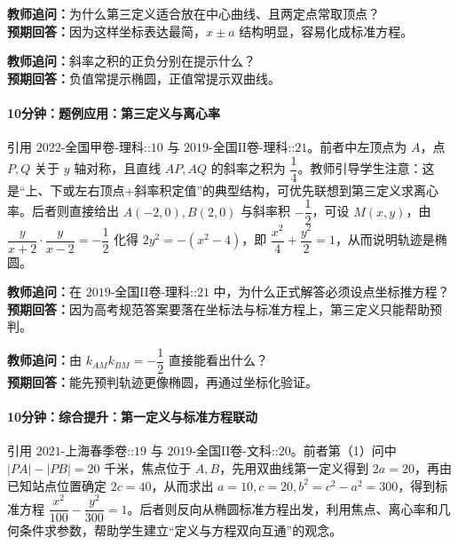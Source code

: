 \documentclass[UTF8,a4paper,11pt]{ctexart}
\begin{document}
\noindent\textbf{教师追问：}为什么第三定义适合放在中心曲线、且两定点常取顶点？\\

\textbf{预期回答：}因为这样坐标表达最简，$x\pm a$ 结构明显，容易化成标准方程。\par

\noindent\textbf{教师追问：}斜率之积的正负分别在提示什么？\\

\textbf{预期回答：}负值常提示椭圆，正值常提示双曲线。\par

\paragraph{10分钟：题例应用：第三定义与离心率}

引用 $\text{2022-全国甲卷-理科::10}$ 与 $\text{2019-全国II卷-理科::21}$。前者中左顶点为 $A$，点 $P,Q$ 关于 $y$ 轴对称，且直线 $AP,AQ$ 的斜率之积为 $\dfrac14$。教师引导学生注意：这是“上、下或左右顶点+斜率积定值”的典型结构，可优先联想到第三定义求离心率。后者则直接给出 $A(-2,0),B(2,0)$ 与斜率积 $-\dfrac12$，可设 $M(x,y)$，由
$\dfrac{y}{x+2}\cdot\dfrac{y}{x-2}=-\dfrac12$
化得
$2y^2=-(x^2-4)$，即 $\dfrac{x^2}{4}+\dfrac{y^2}{2}=1$，从而说明轨迹是椭圆。

\noindent\textbf{教师追问：}在 $\text{2019-全国II卷-理科::21}$ 中，为什么正式解答必须设点坐标推方程？\\

\textbf{预期回答：}因为高考规范答案要落在坐标法与标准方程上，第三定义只能帮助预判。\par

\noindent\textbf{教师追问：}由 $k_{AM}k_{BM}=-\dfrac12$ 直接能看出什么？\\

\textbf{预期回答：}能先预判轨迹更像椭圆，再通过坐标化验证。\par

\paragraph{10分钟：综合提升：第一定义与标准方程联动}

引用 $\text{2021-上海春季卷::19}$ 与 $\text{2019-全国II卷-文科::20}$。前者第（1）问中 $|PA|-|PB|=20$ 千米，焦点位于 $A,B$，先用双曲线第一定义得到 $2a=20$，再由已知站点位置确定 $2c=40$，从而求出 $a=10,c=20,b^2=c^2-a^2=300$，得到标准方程 $\dfrac{x^2}{100}-\dfrac{y^2}{300}=1$。后者则反向从椭圆标准方程出发，利用焦点、离心率和几何条件求参数，帮助学生建立“定义与方程双向互通”的观念。
\end{document}
